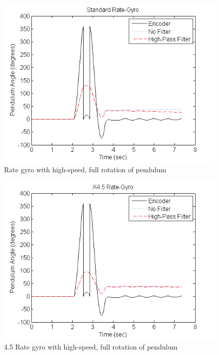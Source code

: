 \documentclass{article}
\theoremstyle{plain}
\theoremstyle{definition}
\theoremstyle{remark}
\begin{document}
\begin{figure}[hbt]
\begin{center}
\includegraphics[width = 12cm]{FullRotation_Gyro.png}
\caption{Rate gyro with high-speed, full rotation of pendulum}
\label{full_gyro}
\end{center}
\end{figure}

\begin{figure}[hbt]
\begin{center}
\includegraphics[width = 12cm]{FullRotation_Gyro45.png}
\caption{4.5 Rate gyro with high-speed, full rotation of pendulum}
\label{full_gyro45}
\end{center}
\end{figure}
\end{document}

